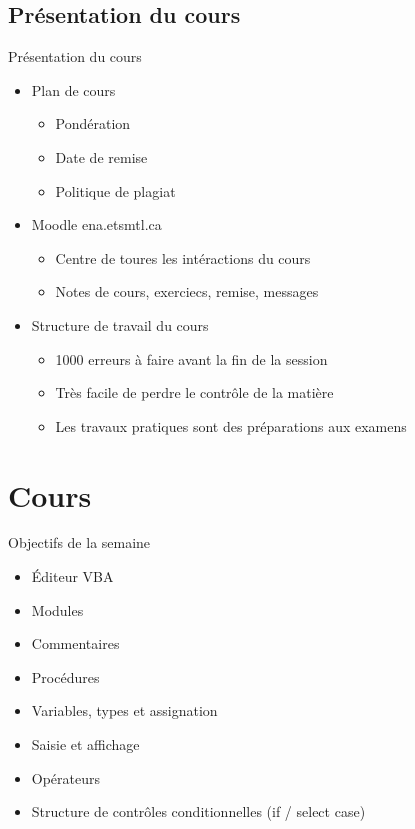 \documentclass[aspectratio=169,usenames,dvipsnames]{beamer}
\begin{document}
    \subsection{{Présentation du cours}}
    \begin{frame}[t]{Présentation du cours}
        \begin{itemize}
            \item Plan de cours
            \begin{itemize}
                \item Pondération
                \item Date de remise
                \item Politique de plagiat
            \end{itemize}
            \pause
            \item Moodle ena.etsmtl.ca
            \begin{itemize}
                \item Centre de toures les intéractions du cours
                \item Notes de cours, exerciecs, remise, messages
            \end{itemize}
            \pause
            \item Structure de travail du cours
            \begin{itemize}
                \item 1000 erreurs à faire avant la fin de la session
                \item Très facile de perdre le contrôle de la matière
                \item Les travaux pratiques sont des préparations aux examens
            \end{itemize}
        \end{itemize}
    \end{frame}
    \section{Cours}
    \begin{frame}{Objectifs de la semaine}
        \begin{itemize}
            \item Éditeur VBA
            \item Modules
            \item Commentaires
            \item Procédures
            \item Variables, types et assignation
            \item Saisie et affichage
            \item Opérateurs
            \item Structure de contrôles conditionnelles (if / select case)
        \end{itemize}
    \end{frame}
\end{document}
